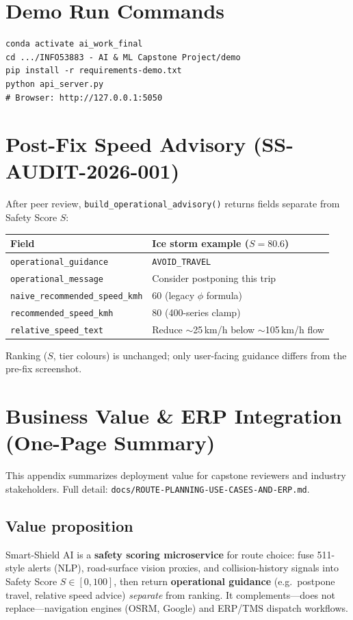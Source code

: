 \documentclass[11pt,a4paper]{article}
\begin{document}
\section{Demo Run Commands}
\label{app:demo}

\begin{verbatim}
conda activate ai_work_final
cd .../INFO53883 - AI & ML Capstone Project/demo
pip install -r requirements-demo.txt
python api_server.py
# Browser: http://127.0.0.1:5050
\end{verbatim}

\section{Post-Fix Speed Advisory (SS-AUDIT-2026-001)}
\label{app:postfix}

After peer review, \texttt{build\_operational\_advisory()} returns fields separate from Safety Score $S$:

\begin{tabular}{@{}ll@{}}
\toprule
Field & Ice storm example ($S=80.6$) \\
\midrule
\texttt{operational\_guidance} & \texttt{AVOID\_TRAVEL} \\
\texttt{operational\_message} & Consider postponing this trip \\
\texttt{naive\_recommended\_speed\_kmh} & 60 (legacy $\phi$ formula) \\
\texttt{recommended\_speed\_kmh} & 80 (400-series clamp) \\
\texttt{relative\_speed\_text} & Reduce $\sim$25\,km/h below $\sim$105\,km/h flow \\
\bottomrule
\end{tabular}

Ranking ($S$, tier colours) is unchanged; only user-facing guidance differs from the pre-fix screenshot.

\section{Business Value \& ERP Integration (One-Page Summary)}
\label{app:business}

This appendix summarizes deployment value for capstone reviewers and industry stakeholders. Full detail: \texttt{docs/ROUTE-PLANNING-USE-CASES-AND-ERP.md}.

\subsection*{Value proposition}
Smart-Shield AI is a \textbf{safety scoring microservice} for route choice: fuse 511-style alerts (NLP), road-surface vision proxies, and collision-history signals into Safety Score $S \in [0,100]$, then return \textbf{operational guidance} (e.g.\ postpone travel, relative speed advice) \emph{separate} from ranking. It complements---does not replace---navigation engines (OSRM, Google) and ERP/TMS dispatch workflows.
\end{document}
